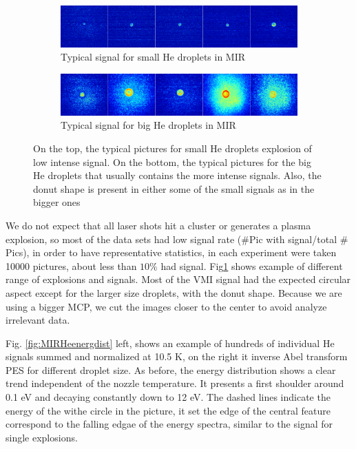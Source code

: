 \begin{figure}[h!]
\centering
\begin{subfigure}[l]{0.7\textwidth}
\caption{Typical signal for small He droplets in MIR}
\includegraphics[width=1\textwidth]{../Images/results/Mir_He_Dropletsize/RAW_MIR_He_smalldroplets.png}   				\end{subfigure}
\begin{subfigure}[l]{0.7\textwidth}
\caption{Typical signal for big He droplets in MIR}
\includegraphics[width=1\textwidth]{../Images/results/Mir_He_Dropletsize/RAW_MIR_He_bigdroplets.png} 
\end{subfigure}

\caption[MIR He raw images]{On the top, the typical pictures for small He droplets explosion of low intense signal. On the bottom, the typical pictures for the big He droplets that usually contains the more intense signals. Also, the donut shape is present in either some of the small signals as in the bigger ones}
\label{fig:MIRHeexample}
\end{figure}

We do not expect that all laser shots hit a cluster or generates a plasma explosion, so  most of the data sets had low signal rate ($\#$Pic with signal/total $\#$ Pics), in order to have representative statistics, in each experiment were taken 10000 pictures, about less than $10\%$ had signal. Fig\ref{fig:MIRHeexample} shows  example of different range of explosions and signals. Most of the VMI signal had the expected circular aspect except for the larger size droplets, with the donut shape. Because we are using a bigger MCP, we cut the images closer to the center to avoid analyze irrelevant data.

Fig. \ref{fig:MIRHeenergdist} left, shows an example of hundreds of individual He signals summed and normalized at 10.5 K, on the right it inverse Abel transform PES for different droplet size. As before, the energy distribution shows a clear trend independent of the nozzle temperature. It presents a first shoulder around 0.1 eV and decaying constantly down to 12 eV. The dashed lines indicate the energy of the withe circle in the picture, it set the edge of the central feature correspond to the falling edgae of the energy spectra, similar to the signal for single explosions.

